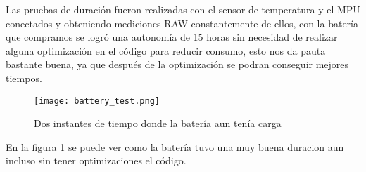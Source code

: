 Las pruebas de duración fueron realizadas con el sensor de temperatura y el MPU conectados y obteniendo mediciones RAW
constantemente de ellos, con la batería que compramos se logró una autonomía de 15 horas sin necesidad de realizar alguna
optimización en el código para reducir consumo, esto nos da pauta bastante buena, ya que después de la optimización se
podran conseguir mejores tiempos.

\begin{figure}[htp!]
    \centering
    \texttt{[image: battery\_test.png]}
    \caption{Dos instantes de tiempo donde la batería aun tenía carga }
    \label{fig: battery_test}
\end{figure}
\FloatBarrier

En la figura \ref{fig: battery_test} se puede ver como la batería tuvo una muy buena duracion aun incluso sin tener optimizaciones
el código.

